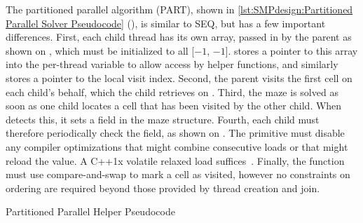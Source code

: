 \begin{fcvref}
The partitioned parallel algorithm (PART), shown in
\cref{lst:SMPdesign:Partitioned Parallel Solver Pseudocode}
(),
is similar to SEQ, but has a few important differences.
First, each child thread has its own  array, passed in by
the parent as shown on ,
which must be initialized to all [$-1$, $-1$].
 stores a pointer to this array into the per-thread variable
 to allow access by helper functions, and similarly stores
a pointer to the local visit index.
Second, the parent visits the first cell on each child's behalf,
which the child retrieves on .
Third, the maze is solved as soon as one child locates a cell that has
been visited by the other child.
When  detects this,
it sets a  field in the maze structure.
Fourth, each child must therefore periodically check the 
field, as shown on .
The  primitive must disable any compiler
optimizations that might combine consecutive loads or that
might reload the value.
A C++1x volatile relaxed load suffices~\cite{RichardSmith2019N4800}.
Finally, the  function must use
compare-and-swap to mark a cell as visited, however
no constraints on ordering are required beyond those provided by
thread creation and join.
\end{fcvref}

\begin{listing}
\begin{fcvlabel}
\end{fcvlabel}
\caption{Partitioned Parallel Helper Pseudocode}
\label{lst:SMPdesign:Partitioned Parallel Helper Pseudocode}
\end{listing}

